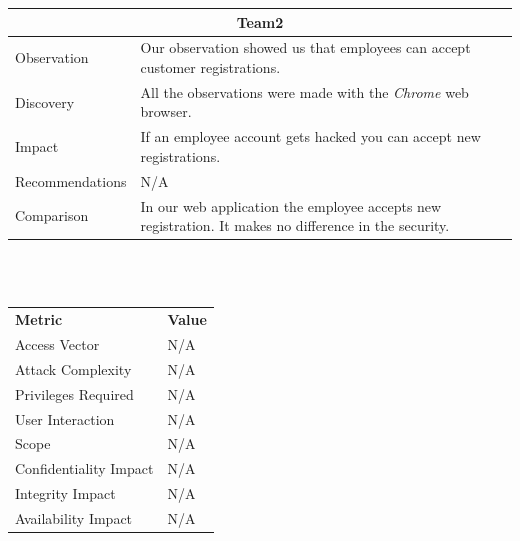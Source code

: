 \documentclass[headsepline,footsepline,footinclude=false,oneside,fontsize=11pt,paper=a4,listof=totoc,bibliography=totoc]{scrbook} %
\begin{document}
\begin{tabular}{ l|p{11cm}  }
	\hline
	\multicolumn{2}{c}{\textbf{Team2}} \\
	\hline
	Observation   & Our observation showed us that employees can accept customer registrations. \\
	Discovery  & All the observations were made with the \textit{Chrome} web browser. \\
	Impact    & If an employee account gets hacked you can accept new registrations. \\
	Recommendations & N/A \\
	Comparison & In our web application the employee accepts new registration. It makes no difference in the security. \\
	\hline
\end{tabular}
\\
\vspace{0.5cm}
\\
\begin{center}
	\begin{tabular}{ll}
		\rowcolor[HTML]{34CDF9}
		{\color[HTML]{ECF4FF} \textbf{Metric}}        & {\color[HTML]{ECF4FF} \textbf{Value}} \\
		\rowcolor[HTML]{BBDAFF}
		{\color[HTML]{333333} Access Vector}          & {\color[HTML]{333333} } N/A              \\
		\rowcolor[HTML]{ECF4FF}
		{\color[HTML]{333333} Attack Complexity}      & {\color[HTML]{333333} } N/A              \\
		\rowcolor[HTML]{BBDAFF}
		{\color[HTML]{333333} Privileges Required}    & {\color[HTML]{333333} } N/A              \\
		\rowcolor[HTML]{ECF4FF}
		{\color[HTML]{333333} User Interaction}       & {\color[HTML]{333333} } N/A              \\
		\rowcolor[HTML]{BBDAFF}
		{\color[HTML]{333333} Scope}                  & {\color[HTML]{333333} } N/A              \\
		\rowcolor[HTML]{ECF4FF}
		{\color[HTML]{333333} Confidentiality Impact} & {\color[HTML]{333333} } N/A              \\
		\rowcolor[HTML]{BBDAFF}
		{\color[HTML]{333333} Integrity Impact}       & {\color[HTML]{333333} } N/A              \\
		\rowcolor[HTML]{ECF4FF}
		{\color[HTML]{333333} Availability Impact}    & {\color[HTML]{333333} } N/A
	\end{tabular}
\end{center}
\pagebreak
\end{document}
